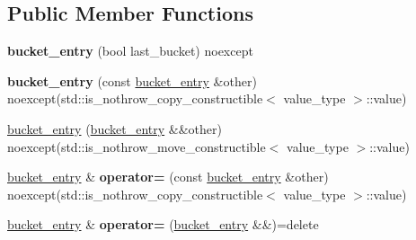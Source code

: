 \subsection*{Public Member Functions}
\begin{DoxyCompactItemize}
\item 
\mbox{\label{classtsl_1_1detail__robin__hash_1_1bucket__entry_a02b183ad60395bb88562e8166d153759}} 
{\bfseries bucket\+\_\+entry} (bool last\+\_\+bucket) noexcept
\item 
\mbox{\label{classtsl_1_1detail__robin__hash_1_1bucket__entry_a3df7516de58606a8c581da4b0551a1fa}} 
{\bfseries bucket\+\_\+entry} (const \mbox{\hyperlink{classtsl_1_1detail__robin__hash_1_1bucket__entry}{bucket\+\_\+entry}} \&other) noexcept(std\+::is\+\_\+nothrow\+\_\+copy\+\_\+constructible$<$ value\+\_\+type $>$\+::value)
\item 
\mbox{\hyperlink{classtsl_1_1detail__robin__hash_1_1bucket__entry_aef8661319886dd65cb3c50b3b7e2202d}{bucket\+\_\+entry}} (\mbox{\hyperlink{classtsl_1_1detail__robin__hash_1_1bucket__entry}{bucket\+\_\+entry}} \&\&other) noexcept(std\+::is\+\_\+nothrow\+\_\+move\+\_\+constructible$<$ value\+\_\+type $>$\+::value)
\item 
\mbox{\label{classtsl_1_1detail__robin__hash_1_1bucket__entry_afb375cd59ca6f2d3c0c57136c57b5a23}} 
\mbox{\hyperlink{classtsl_1_1detail__robin__hash_1_1bucket__entry}{bucket\+\_\+entry}} \& {\bfseries operator=} (const \mbox{\hyperlink{classtsl_1_1detail__robin__hash_1_1bucket__entry}{bucket\+\_\+entry}} \&other) noexcept(std\+::is\+\_\+nothrow\+\_\+copy\+\_\+constructible$<$ value\+\_\+type $>$\+::value)
\item 
\mbox{\label{classtsl_1_1detail__robin__hash_1_1bucket__entry_a439eb2cc9a2fd3121de320f1230c4904}} 
\mbox{\hyperlink{classtsl_1_1detail__robin__hash_1_1bucket__entry}{bucket\+\_\+entry}} \& {\bfseries operator=} (\mbox{\hyperlink{classtsl_1_1detail__robin__hash_1_1bucket__entry}{bucket\+\_\+entry}} \&\&)=delete
\item 
\mbox{\label{classtsl_1_1detail__robin__hash_1_1bucket__entry_a18a6d71a3aebccb487aa897064bdbf66}} 

\end{DoxyCompactItemize}
